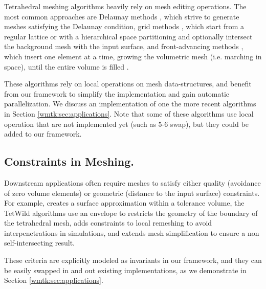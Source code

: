 Tetrahedral meshing algorithms heavily rely on mesh editing operations. The most common approaches are Delaunay methods \cite{shewchuk1998tetrahedral,ruppert1995delaunay,Remacle:2017:ATL,du2003tetrahedral,alliez2005variational,tournois2009interleaving,murphy2001point,CohenSteiner:2002:CDT,chew1989constrained,si2005meshing,shewchuk2002constrained,Si:2014:ICA,cheng2008practical,boissonnat2005provably,jamin2015cgalmesh,Dey:2008:DAD,Chen:2004:ODT,Shewchuk:1996,Cheng:2012:DMG,Bishop2016,Busaryev:RMI:2009,triangulation_in_cgal,tetgen}, which strive to generate meshes satisfying the Delaunay condition, grid methods \cite{Yerry1983,BERN1994,Molino:2003:TMG,Bronson:2013:LCC,Labelle:2007:ISF,Doran:2013:ISI,code:quartet}, which start from a regular lattice or with a hierarchical space partitioning and optionally intersect the background mesh with the input surface, and front-advancing methods \cite{Sadek1980,Cuilliere:2013:ADM,Alauzet:2014:ACA,Haimes:2014:MMO}, which insert one element at a time, growing the volumetric mesh (i.e. marching in space), until the entire volume is filled .

These algorithms rely on local operations on mesh data-structures, and benefit from our framework to simplify the implementation and gain automatic parallelization. We discuss an implementation of one the more recent algorithms \cite{hu2018tetrahedral,Hu:2019:fTetWild} in Section \ref{wmtk:sec:applications}. Note that some of these algorithms use local operation that are not implemented yet (such as 5-6 swap), but they could be added to our framework.

\subsection{Constraints in Meshing.}

Downstream applications often require meshes to satisfy either quality (avoidance of zero volume elements) or geometric (distance to the input surface) constraints. For example, \citet{mandad2015isotopic} creates a surface approximation within a tolerance volume, the TetWild algorithms \cite{hu2018tetrahedral,Hu:2019:fTetWild} use an envelope \cite{Wang:2021} to restricts the geometry of the boundary of the tetrahedral mesh, \cite{Brochu:2012} adds constraints to local remeshing to avoid interpenetrations in simulations, and \cite{gumhold2003intersection} extends mesh simplification \cite{Garland:1999,Popovic:1997} to ensure a non self-intersecting result. 

These criteria are explicitly modeled as invariants in our framework, and they can be easily swapped in and out existing implementations, as we demonstrate in Section \ref{wmtk:sec:applications}.

